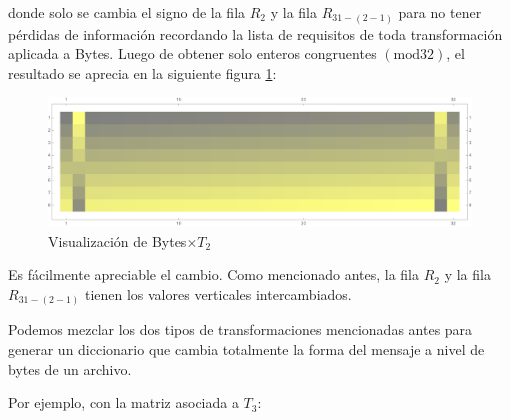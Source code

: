 \documentclass[a4paper]{article}
\begin{document}
donde solo se cambia el signo de la fila $R_2$ y la fila $R_{31 - (2 - 1)}$ para no tener pérdidas de información recordando la lista de requisitos de toda transformación aplicada a Bytes. Luego de obtener solo enteros congruentes $(\text{mod} 32)$, el resultado se aprecia en la siguiente figura \ref{fig:filasC}:

\begin{figure}[H]
    \centering
    \includegraphics[width=\textwidth]{fila}
    \caption{Visualización de Bytes$\times T_2$}
    \label{fig:filasC}
\end{figure}

Es fácilmente apreciable el cambio. Como mencionado antes, la fila $R_2$ y la fila $R_{31 - (2 - 1)}$ tienen los valores verticales intercambiados.

Podemos mezclar los dos tipos de transformaciones mencionadas antes para generar un diccionario que cambia totalmente la forma del mensaje a nivel de bytes de un archivo.

Por ejemplo, con la matriz asociada a $T_3$:
\end{document}
